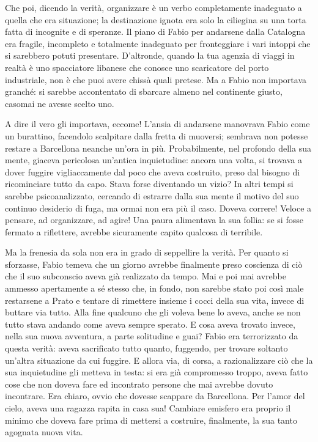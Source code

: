 Che poi, dicendo la verità, organizzare è un verbo completamente inadeguato a quella che era situazione; la destinazione ignota era solo la ciliegina su una torta fatta di incognite e di speranze. Il piano di Fabio per andarsene dalla Catalogna era fragile, incompleto e totalmente inadeguato per fronteggiare i vari intoppi che si sarebbero potuti presentare. D'altronde, quando la tua agenzia di viaggi in realtà è uno spacciatore libanese che conosce uno scaricatore del porto industriale, non è che puoi avere chissà quali pretese. Ma a Fabio non importava granché: si sarebbe accontentato di sbarcare almeno nel continente giusto, casomai ne avesse scelto uno.

A dire il vero gli importava, eccome! L'ansia di andarsene manovrava Fabio come un burattino, facendolo scalpitare dalla fretta di muoversi; sembrava non potesse restare a Barcellona neanche un'ora in più. Probabilmente, nel profondo della sua mente, giaceva pericolosa un'antica inquietudine: ancora una volta, si trovava a dover fuggire vigliaccamente dal poco che aveva costruito, preso dal bisogno di ricominciare tutto da capo. Stava forse diventando un vizio? In altri tempi si sarebbe psicoanalizzato, cercando di estrarre dalla sua mente il motivo del suo continuo desiderio di fuga, ma ormai non era più il caso. Doveva correre! Veloce a pensare, ad organizzare, ad agire! Una paura alimentava la sua follia: se si fosse fermato a riflettere, avrebbe sicuramente capito qualcosa di terribile.

Ma la frenesia da sola non era in grado di seppellire la verità. Per quanto si sforzasse, Fabio temeva che un giorno avrebbe finalmente preso coscienza di ciò che il suo subconscio aveva già realizzato da tempo. Mai e poi mai avrebbe ammesso apertamente a sé stesso che, in fondo, non sarebbe stato poi così male restarsene a Prato e tentare di rimettere insieme i cocci della sua vita, invece di buttare via tutto. Alla fine qualcuno che gli voleva bene lo aveva, anche se non tutto stava andando come aveva sempre sperato. E cosa aveva trovato invece, nella sua nuova avventura, a parte solitudine e guai? Fabio era terrorizzato da questa verità: aveva sacrificato tutto quanto, fuggendo, per trovare soltanto un'altra situazione da cui fuggire. E allora via, di corsa, a razionalizzare ciò che la sua inquietudine gli metteva in testa: si era già compromesso troppo, aveva fatto cose che non doveva fare ed incontrato persone che mai avrebbe dovuto incontrare. Era chiaro, ovvio che dovesse scappare da Barcellona. Per l'amor del cielo, aveva una ragazza rapita in casa sua! Cambiare emisfero era proprio il minimo che doveva fare prima di mettersi a costruire, finalmente, la sua tanto agognata nuova vita.

